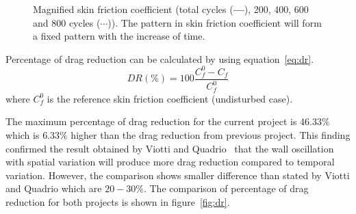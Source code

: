 \begin{figure}[!h]
  \centering
  \caption{Magnified skin friction coefficient (total cycles (\textbf{---}), 200, 400, 600 and 800 cycles ($\cdots$)). The pattern in skin friction coefficient will form a fixed pattern with the increase of time.}
  \label{fig:cf_zoom}
\end{figure}

Percentage of drag reduction can be calculated by using equation~\ref{eq:dr}.
\begin{equation}\label{eq:dr}
  DR(\%) = 100\frac{C_f^0 - C_f}{C_f^0}
\end{equation}
where $C_f^0$ is the reference skin friction coefficient (undisturbed case). 

The maximum percentage of drag reduction for the current project is $46.33\%$ which is $6.33\%$ higher than the drag reduction from previous project. This finding confirmed the result obtained by Viotti and Quadrio~\cite{viotti} that the wall oscillation with spatial variation will produce more drag reduction compared to temporal variation. However, the comparison shows  smaller difference than stated by Viotti and Quadrio which are $20-30\%$. The comparison of percentage of drag reduction for both projects is shown in figure~\ref{fig:dr}. 

